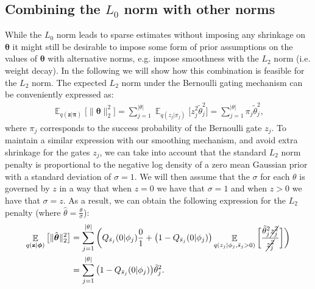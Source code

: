 \documentclass{article} %
\DeclareMathOperator{\E}{\mathbb{E}}
\def\!#1{\boldsymbol{#1}}
\def\*#1{\mathbf{#1}}
\begin{document}
\subsection{Combining the $L_0$ norm with other norms}\label{sec:comb_l0_l2}
While the $L_0$ norm leads to sparse estimates without imposing any shrinkage on $\!\theta$ it might still be desirable to impose some form of prior assumptions on the values of $\!\theta$ with alternative norms, e.g. impose smoothness with the $L_2$ norm (i.e. weight decay). In the following we will show how this combination is feasible for the $L_2$ norm. 
The expected $L_2$ norm under the Bernoulli gating mechanism can be conveniently expressed as:
\begin{align}
    \E_{q(\*z|\!\pi)}\big[\|\!\theta\|_2^2\big] = \sum_{j=1}^{|\theta|}\E_{q(z_j|\pi_j)}\big[z_j^2\tilde{\theta}_j^2\big] = \sum_{j=1}^{|\theta|}\pi_j\tilde{\theta}_j^2,
\end{align}
where $\pi_j$ corresponds to the success probability of the Bernoulli gate $z_j$. To maintain a similar expression with our smoothing mechanism, and avoid extra shrinkage for the gates $z_j$, we can take into account that the standard $L_2$ norm penalty is proportional to the negative log density of a zero mean Gaussian prior with a standard deviation of $\sigma = 1$. We will then assume that the $\sigma$ for each $\theta$ is governed by $z$ in a way that when $z = 0$ we have that $\sigma = 1$ and when $z > 0$ we have that $\sigma = z$. As a result, we can obtain the following expression for the $L_2$ penalty (where $\hat{\theta} = \frac{\theta}{\sigma}$):
\begin{align}
    \E_{q(\*z|\!\phi)}\big[\|\hat{\!\theta}\|^2_2\big] & 
    = \sum_{j=1}^{|\theta|}\bigg( Q_{\bar{s}_j}(0|\phi_j)\frac{0}{1} + \big(1 - Q_{\bar{s}_j}(0|\phi_j)\big)\E_{q(z_j|\phi_j, \bar{s}_j > 0)}\bigg[\frac{\tilde{\theta}_j^2 \cancel{z_j^2}}{\cancel{z_j^2}}\bigg]\bigg) \nonumber \\
    & = \sum_{j=1}^{|\theta|}\big(1 - Q_{\bar{s}_j}(0|\phi_j)\big)\tilde{\theta}_j^2.
\end{align}
\end{document}
